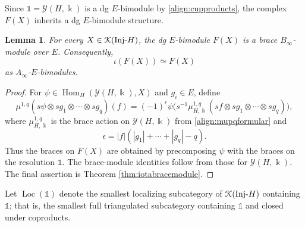 \documentclass[a4paper, 11pt]{amsart}
\newtheorem{lem}[thm]{Lemma}
\theoremstyle{definition}
\theoremstyle{remark}
\numberwithin{equation}{section}
\newcommand{\Y}{\mathcal{Y}}
\newcommand{\EK}{\EuScript{K}}
\begin{document}
Since $\mathbb 1=\Y(H,\Bbbk)$ is a dg $E$-bimodule by \eqref{align:cupproducts}, the complex $F(X)$ inherits a dg $E$-bimodule structure.
\begin{lem}\label{lem:bracemoduleyhk}
For every $X\in\EK(\mathrm{Inj}\text{-}H)$, the dg $E$-bimodule $F(X)$ is a brace $B_\infty$-module over $E$. Consequently,
\[
\iota(F(X))\simeq F(X)
\]
as $A_\infty$-$E$-bimodules.
\end{lem}
\begin{proof}
For $\psi\in\operatorname{Hom}_H(\Y(H,\Bbbk),X)$ and $g_i\in E$, define
\[
\mu^{1,q}(s\psi\otimes sg_1\otimes\dotsb\otimes sg_q)(f)
 =(-1)^\epsilon
 \psi\bigl(s^{-1}\mu_{H,\Bbbk}^{1,q}(sf\otimes sg_1\otimes\dotsb\otimes sg_q)\bigr),
\]
where $\mu_{H,\Bbbk}^{1,q}$ is the brace action on $\Y(H,\Bbbk)$ from \eqref{align:mupqformular} and
\[
\epsilon=|f|(|g_1|+\cdots+|g_q|-q).
\]
Thus the braces on $F(X)$ are obtained by precomposing $\psi$ with the braces on the resolution $\mathbb 1$. The brace-module identities follow from those for $\Y(H,\Bbbk)$. The final assertion is Theorem \ref{thm:iotabracemodule}.
\end{proof}

Let $\operatorname{Loc}(\mathbb 1)$ denote the smallest localizing subcategory of $\EK(\mathrm{Inj}\text{-}H)$ containing $\mathbb 1$; that is, the smallest full triangulated subcategory containing $\mathbb 1$ and closed under coproducts.
\end{document}
